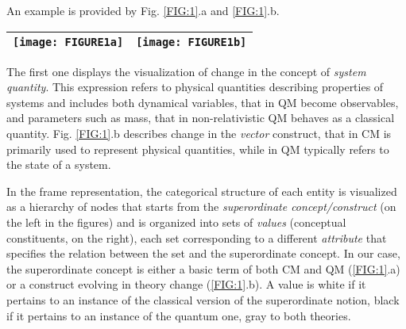 \documentclass[twocolumn,secnumarabic,amssymb, nobibnotes, aps, prd, nofootinbib]{revtex4-2}
\begin{document}
An example is provided by Fig. \ref{FIG:1}.a and \ref{FIG:1}.b.
\begin{figure*}[!htbp]
    \centering
\begin{tabular}{|r|l|} \hline
    \texttt{[image: FIGURE1a]} &
    \texttt{[image: FIGURE1b]} \\ \hline %
\end{tabular}
    \caption{Visualizing categorical change: (a) the concept of \emph{system quantity}; (b) the \emph{vector} construct.}
    \label{FIG:1}
\end{figure*}
The first one displays the visualization of change in the concept of \textit{system quantity}. This expression refers to physical quantities describing properties of systems and includes both dynamical variables, that in QM become observables, and parameters such as mass, that in non-relativistic QM behaves as a classical quantity. Fig. \ref{FIG:1}.b describes change in the \textit{vector} construct, that in CM is primarily used to represent physical quantities, while in QM typically refers to the state of a system.

In the frame representation, the categorical structure of each entity is visualized as a hierarchy of nodes that starts from the \textit{superordinate concept/construct} (on the left in the figures) and is organized into sets of \textit{values} (conceptual constituents, on the right), each set corresponding to a different \textit{attribute} that specifies the relation between the set and the superordinate concept. In our case, the superordinate concept is either a basic term of both CM and QM (\ref{FIG:1}.a) or a construct evolving in theory change (\ref{FIG:1}.b). A value is white if it pertains to an instance of the classical version of the superordinate notion, black if it pertains to an instance of the quantum one, gray to both theories.
\end{document}
